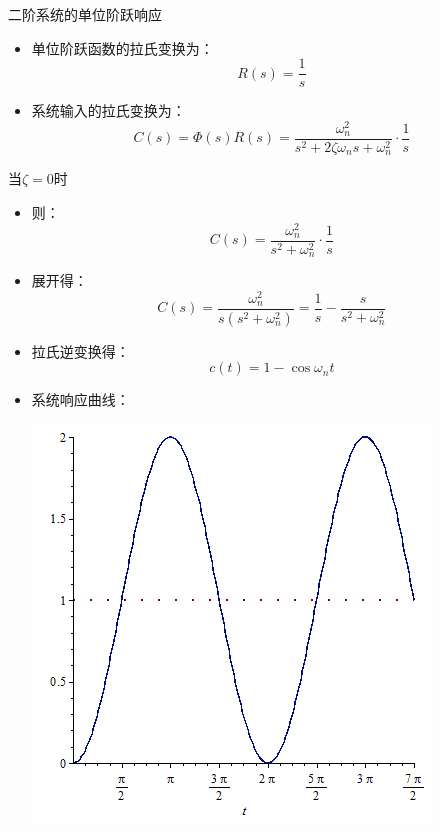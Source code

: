 \begin{frame}{二阶系统的单位阶跃响应}
\begin{block}{}
\begin{itemize}
\item<+-> 单位阶跃函数的拉氏变换为：
\[R(s)=\frac{1}{s}\]
\item<+-> 系统输入的拉氏变换为：
\[C(s)=\Phi(s)R(s)=\frac{\omega_n^2}{s^2+2\zeta\omega_ns+\omega_n^2}\cdot\frac{1}{s}\]
\end{itemize}
\end{block}
\end{frame}
\begin{frame}
\begin{block}{当$\zeta=0$时}
\begin{itemize}
\item<+-> 则：
\[C(s)=\frac{\omega_n^2}{s^2+\omega_n^2}\cdot\frac{1}{s}\]
\item<+-> 展开得：
\[C(s)=\frac{\omega_n^2}{s(s^2+\omega_n^2)}=\frac{1}{s}-\frac{s}{s^2+\omega_n^2}\]
\end{itemize}
\end{block}
\end{frame}
\begin{frame}
\begin{block}{}
\begin{itemize}
\item<+-> 拉氏逆变换得：
\[c(t)=1-\cos\omega_nt\]
\item<+-> 系统响应曲线：

\includegraphics[scale=0.25]{wuzuni.png}
\end{itemize}
\end{block}
\end{frame}
